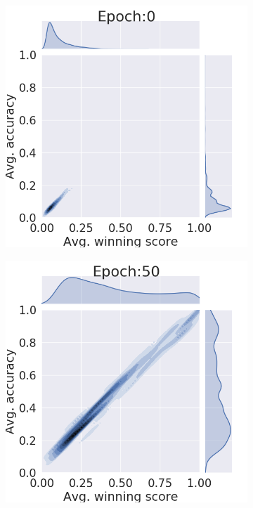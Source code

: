 \documentclass{article}
\begin{document}
\begin{figure}[htb]
\begin{subfigure}[b]{0.19\textwidth}
         \caption{}
     \end{subfigure}
         \centering
     \begin{subfigure}[b]{0.19\textwidth}
         \centering
         \noindent\includegraphics[width=\textwidth]{images/joint_plot/mixup/0.png}
         \caption{}
     \end{subfigure}
     \hfill
     \begin{subfigure}[b]{0.19\textwidth}
         \centering
         \noindent\includegraphics[width=\textwidth]{images/joint_plot/mixup/50.png}

\end{subfigure}
\end{figure}
\end{document}
